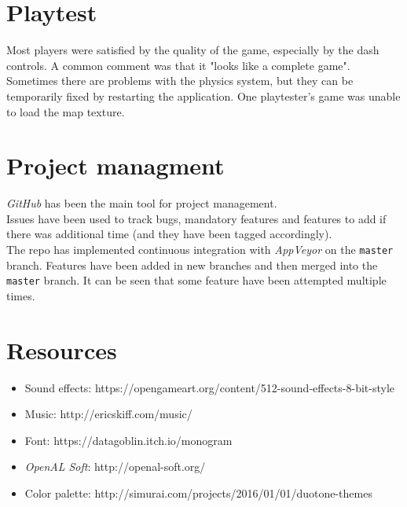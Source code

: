 \documentclass[10pt, a4paper]{article}
\begin{document}
    \section{Playtest}
    Most players were satisfied by the quality of the game, especially by the dash controls. A common comment was that it "looks like a complete game".
    Sometimes there are problems with the physics system, but they can be temporarily fixed by restarting the application.
    One playtester’s game was unable to load the map texture.
    
    \section{Project managment}
    \textit{GitHub} has been the main tool for project management.\\
    Issues have been used to track bugs, mandatory features and features to add if there was additional time (and they have been tagged accordingly).\\
    The repo has implemented continuous integration with \textit{AppVeyor} on the \texttt{master} branch.
    Features have been added in new branches and then merged into the \texttt{master} branch. It can be seen that some feature have been attempted multiple times.
    
    \section{Resources}
    \begin{itemize}
    	\item Sound effects: https://opengameart.org/content/512-sound-effects-8-bit-style
    	\item Music: http://ericskiff.com/music/
    	\item Font: https://datagoblin.itch.io/monogram
    	\item \textit{OpenAL Soft}: http://openal-soft.org/
    	\item Color palette: http://simurai.com/projects/2016/01/01/duotone-themes
    \end{itemize}
    
    


		
\end{document}
